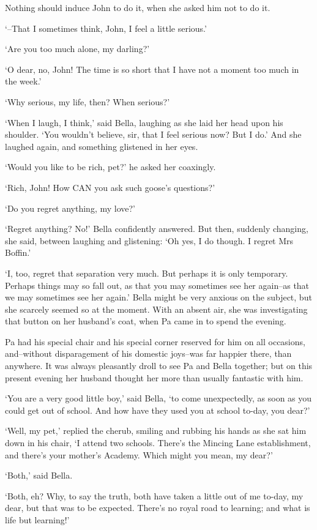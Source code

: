 Nothing should induce John to do it, when she asked him not to do it.

‘--That I sometimes think, John, I feel a little serious.’

‘Are you too much alone, my darling?’

‘O dear, no, John! The time is so short that I have not a moment too
much in the week.’

‘Why serious, my life, then? When serious?’

‘When I laugh, I think,’ said Bella, laughing as she laid her head upon
his shoulder. ‘You wouldn’t believe, sir, that I feel serious now? But I
do.’ And she laughed again, and something glistened in her eyes.

‘Would you like to be rich, pet?’ he asked her coaxingly.

‘Rich, John! How CAN you ask such goose’s questions?’

‘Do you regret anything, my love?’

‘Regret anything? No!’ Bella confidently answered. But then, suddenly
changing, she said, between laughing and glistening: ‘Oh yes, I do
though. I regret Mrs Boffin.’

‘I, too, regret that separation very much. But perhaps it is only
temporary. Perhaps things may so fall out, as that you may sometimes see
her again--as that we may sometimes see her again.’ Bella might be very
anxious on the subject, but she scarcely seemed so at the moment. With
an absent air, she was investigating that button on her husband’s coat,
when Pa came in to spend the evening.

Pa had his special chair and his special corner reserved for him on
all occasions, and--without disparagement of his domestic joys--was far
happier there, than anywhere. It was always pleasantly droll to see Pa
and Bella together; but on this present evening her husband thought her
more than usually fantastic with him.

‘You are a very good little boy,’ said Bella, ‘to come unexpectedly,
as soon as you could get out of school. And how have they used you at
school to-day, you dear?’

‘Well, my pet,’ replied the cherub, smiling and rubbing his hands as she
sat him down in his chair, ‘I attend two schools. There’s the Mincing
Lane establishment, and there’s your mother’s Academy. Which might you
mean, my dear?’

‘Both,’ said Bella.

‘Both, eh? Why, to say the truth, both have taken a little out of me
to-day, my dear, but that was to be expected. There’s no royal road to
learning; and what is life but learning!’

